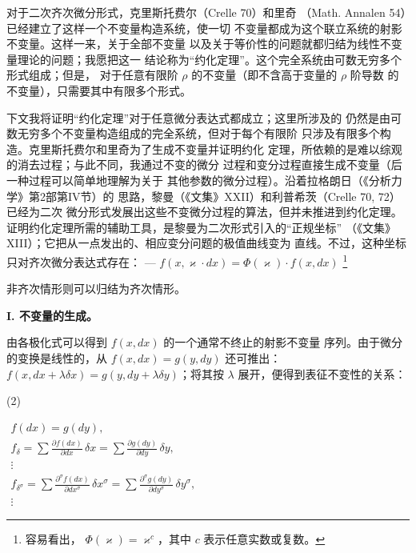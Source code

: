 \documentclass[11pt]{article}
\providecommand{\srcfn}[2]{%
  \begingroup
  \renewcommand{\thefootnote}{#1}%
  \footnote{#2}%
  \addtocounter{footnote}{-1}%
  \endgroup}
\providecommand{\srcnumdisplay}[3][3.4em]{%
  \par\smallskip\noindent
  \begin{minipage}[t]{#1}\vspace*{0pt}#2\end{minipage}%
  \begin{minipage}[t]{\dimexpr\linewidth-#1\relax}\vspace*{0pt}\centering
  \(\displaystyle #3\)
  \end{minipage}\par\smallskip}
\begin{document}
对于二次齐次微分形式，克里斯托费尔（Crelle 70）和里奇
（Math. Annalen 54）已经建立了这样一个不变量构造系统，使一切
不变量都成为这个联立系统的射影不变量。这样一来，关于全部不变量
以及关于等价性的问题就都归结为线性不变量理论的问题；我愿把这一
结论称为“约化定理”。这个完全系统由可数无穷多个形式组成；但是，
对于任意有限阶 \(\rho\) 的不变量（即不含高于变量的 \(\rho\) 阶导数
的不变量），只需要其中有限多个形式。

下文我将证明“约化定理”对于任意微分表达式都成立；这里所涉及的
仍然是由可数无穷多个不变量构造组成的完全系统，但对于每个有限阶
只涉及有限多个构造。克里斯托费尔和里奇为了生成不变量并证明约化
定理，所依赖的是难以综观的消去过程；与此不同，我通过不变的微分
过程和变分过程直接生成不变量（后一种过程可以简单地理解为关于
其他参数的微分过程）。沿着拉格朗日（《分析力学》第2部第IV节）的
思路，黎曼（《文集》XXII）和利普希茨（Crelle 70, 72）已经为二次
微分形式发展出这些不变微分过程的算法，但并未推进到约化定理。
证明约化定理所需的辅助工具，是黎曼为二次形式引入的“正规坐标”
（《文集》XIII）；它把从一点发出的、相应变分问题的极值曲线变为
直线。不过，这种坐标只对齐次微分表达式存在：
--- \(f(x,\varkappa\cdot dx)=\Phi(\varkappa)\cdot f(x,dx)\)\srcfn{1)}{容易看出，
\(\Phi(\varkappa)=\varkappa^c\)，其中 \(c\) 表示任意实数或复数。}
非齐次情形则可以归结为齐次情形。

\begin{center}
\textbf{I. 不变量的生成。}
\end{center}

由各极化式可以得到 \(f(x,dx)\) 的一个通常不终止的射影不变量
序列。由于微分的变换是线性的，从 \(f(x,dx)=g(y,dy)\) 还可推出：
\(f(x,dx+\lambda\delta x)=g(y,dy+\lambda\delta y)\)；将其按
\(\lambda\) 展开，便得到表征不变性的关系：
\srcnumdisplay{(2)}{%
\begin{gathered}
f(dx)=g(dy),\\
f_\delta=\sum\frac{\partial f(dx)}{\partial dx}\,\delta x
       =\sum\frac{\partial g(dy)}{\partial dy}\,\delta y,\\
\vdots\\
f_{\delta^\sigma}=
\sum\frac{\partial^\sigma f(dx)}{\partial dx^\sigma}\,\delta x^\sigma
=
\sum\frac{\partial^\sigma g(dy)}{\partial dy^\sigma}\,\delta y^\sigma,\\
\vdots
\end{gathered}
}
\end{document}

